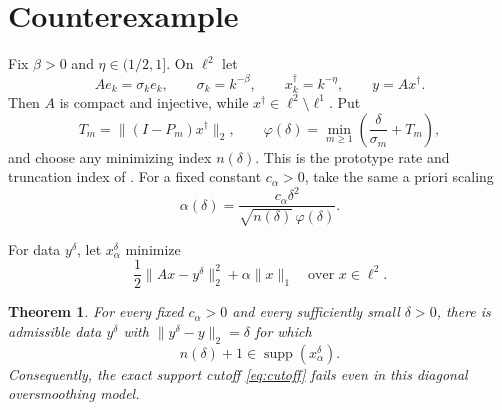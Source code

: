 \documentclass[11pt]{article}
\newtheorem{theorem}{Theorem}
\newcommand{\ellone}{\ell^1}
\newcommand{\elltwo}{\ell^2}
\newcommand{\supp}{\operatorname{supp}}
\begin{document}
\section{Counterexample}

Fix $\beta>0$ and $\eta\in(1/2,1]$.  On $\elltwo$ let
\[
  Ae_k=\sigma_ke_k,\qquad \sigma_k=k^{-\beta},
  \qquad x_k^\dagger=k^{-\eta},
  \qquad y=Ax^\dagger.
\]
Then $A$ is compact and injective, while
$x^\dagger\in\elltwo\setminus\ellone$.  Put
\[
  T_m=\|(I-P_m)x^\dagger\|_2,
  \qquad
  \varphi(\delta)=\min_{m\geq1}\left(\frac{\delta}{\sigma_m}+T_m\right),
\]
and choose any minimizing index $n(\delta)$.  This is the prototype rate and
truncation index of \cite[Section~4]{GH2019}.  For a fixed constant
$c_\alpha>0$, take the same a priori scaling
\begin{equation}\label{eq:alpha}
  \alpha(\delta)=
  \frac{c_\alpha\delta^2}
       {\sqrt{n(\delta)}\,\varphi(\delta)}.
\end{equation}

For data $y^\delta$, let $x_\alpha^\delta$ minimize
\begin{equation}\label{eq:tikh}
  \frac12\|Ax-y^\delta\|_2^2+\alpha\|x\|_1
  \quad\text{over }x\in\elltwo.
\end{equation}

\begin{theorem}\label{thm:main}
For every fixed $c_\alpha>0$ and every sufficiently small $\delta>0$, there
is admissible data $y^\delta$ with $\|y^\delta-y\|_2=\delta$ for which
\[
  n(\delta)+1\in\supp(x_\alpha^\delta).
\]
Consequently, the exact support cutoff \eqref{eq:cutoff} fails even in this
diagonal oversmoothing model.
\end{theorem}
\end{document}
